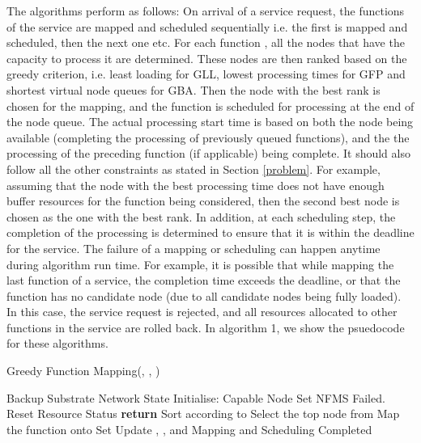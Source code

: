 \documentclass[conference]{IEEEtran}
\begin{document}
\indent The algorithms perform as follows: On arrival of a service request, the functions of the service are mapped and scheduled sequentially i.e. the first is mapped and scheduled, then the next one etc. For each function , all the nodes  that have the capacity to process it are determined. These nodes are then ranked based on the greedy criterion, i.e. least loading for GLL, lowest processing times for GFP and shortest virtual node queues for GBA. Then the node with the best rank is chosen for the mapping, and the function is scheduled for processing at the end of the node queue. The actual processing start time is based on both the node being available (completing the processing of previously queued functions), and the the processing of the preceding function (if applicable) being complete. It should also follow all the other constraints as stated in Section \ref{problem}. For example, assuming that the node with the best processing time does not have enough buffer resources for the function being considered, then the second best node is chosen as the one with the best rank. In addition, at each scheduling step, the completion of the processing is determined to ensure that it is within the deadline for the service. The failure of a mapping or scheduling can happen anytime during algorithm run time. For example, it is possible that while mapping the last function of a service, the completion time exceeds the deadline, or that the function has no candidate node (due to all candidate nodes being fully loaded). In this case, the service request is rejected, and all resources allocated to other functions in the service are rolled back. In algorithm 1, we show the psuedocode for these algorithms.
\begin{algorithm}[t]
\caption{Greedy Function Mapping(, , )}
\label{greedy}
\begin{algorithmic}[1]
\STATE Backup Substrate Network State
\STATE Initialise: Capable Node Set 
\IF{()}
\STATE 
\ENDIF
{}	
\STATE 	
\IF{\Big(()  (  ) (  )\Big)}
\STATE 
\ENDIF
\ENDFOR
\IF{}
\STATE NFMS Failed. Reset Resource Status
\STATE \textbf{return}
\ENDIF
\STATE Sort  according to 
\STATE Select the top node  from 
\STATE Map the function  onto 
\STATE Set 
\STATE Update , , and 
\ENDFOR
\STATE Mapping and Scheduling Completed
\end{algorithmic}
\end{algorithm}
\end{document}
